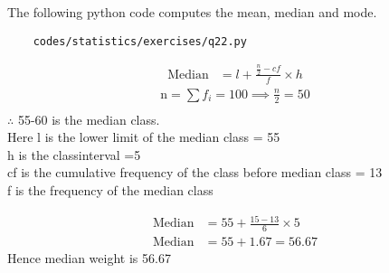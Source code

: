    The following python code computes the mean, median and mode.
	\begin{lstlisting}
	codes/statistics/exercises/q22.py
	\end{lstlisting}
	\begin{align}
	\text{Median} &= l + \frac{\frac{n}{2} -cf}{f}\times h
	\end{align}
	\begin{align}
	\text{n} = \sum f_{i} = 100 \implies \frac{n}{2} = 50\\
	\end{align}
	$\therefore$ 55-60 is the median class.\\
	Here l is the lower limit of the median class = 55\\
	h is the classinterval =5\\
	cf is the cumulative frequency of the class before median class = 13\\
	f is the frequency of the median class

	\begin{align}
	\text{Median} &= 55 + \frac{15 - 13}{6}\times 5\\
	\text{Median} &= 55 + 1.67 = 56.67
	\end{align}
	Hence median weight is 56.67

